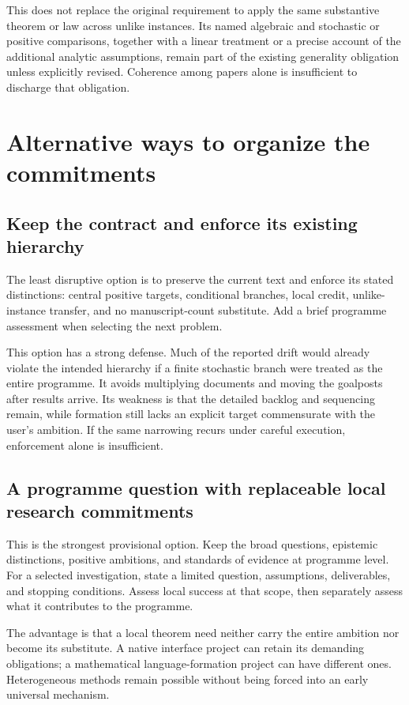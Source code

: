 \documentclass[11pt]{article}
\begin{document}
This does not replace the original requirement to apply the same substantive theorem or law across unlike instances. Its named algebraic and stochastic or positive comparisons, together with a linear treatment or a precise account of the additional analytic assumptions, remain part of the existing generality obligation unless explicitly revised. Coherence among papers alone is insufficient to discharge that obligation.

\section{Alternative ways to organize the commitments}
\label{sec:architectures}

\subsection{Keep the contract and enforce its existing hierarchy}

The least disruptive option is to preserve the current text and enforce its stated distinctions: central positive targets, conditional branches, local credit, unlike-instance transfer, and no manuscript-count substitute. Add a brief programme assessment when selecting the next problem.

This option has a strong defense. Much of the reported drift would already violate the intended hierarchy if a finite stochastic branch were treated as the entire programme. It avoids multiplying documents and moving the goalposts after results arrive. Its weakness is that the detailed backlog and sequencing remain, while formation still lacks an explicit target commensurate with the user's ambition. If the same narrowing recurs under careful execution, enforcement alone is insufficient.

\subsection{A programme question with replaceable local research commitments}
\label{sec:two-level}

This is the strongest provisional option. Keep the broad questions, epistemic distinctions, positive ambitions, and standards of evidence at programme level. For a selected investigation, state a limited question, assumptions, deliverables, and stopping conditions. Assess local success at that scope, then separately assess what it contributes to the programme.

The advantage is that a local theorem need neither carry the entire ambition nor become its substitute. A native interface project can retain its demanding obligations; a mathematical language-formation project can have different ones. Heterogeneous methods remain possible without being forced into an early universal mechanism.
\end{document}
